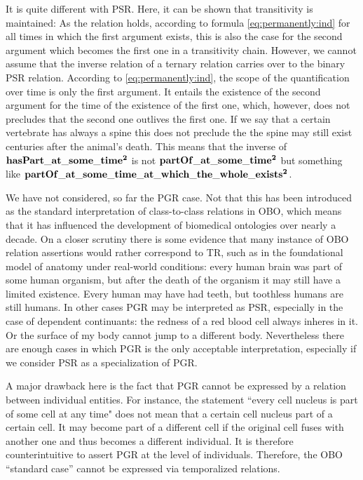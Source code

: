 It is quite different with PSR. Here, it can be shown that transitivity is maintained: As the relation holds, according to formula \ref{eq:permanently:ind} for all times in which the first argument exists, this is also the case for the second argument which becomes the first one in a transitivity chain.
However, we cannot assume that the inverse relation of a ternary relation carries over to the binary PSR relation. According to \ref{eq:permanently:ind}, the scope of the quantification over time is only the first argument. It entails the existence of the second argument for the time of the existence of the first one, which, however, does not precludes that the second one outlives the first one. If we say that a certain vertebrate has always a spine this does not preclude the the spine may still exist centuries after the animal's death.    
This means that the inverse of $\mathrm{\mathbf{hasPart\_at\_some\_time^2}}$ is not $\mathrm{\mathbf{partOf\_at\_some\_time^2}}$ but something like $\mathrm{\mathbf{partOf\_at\_some\_time\_at\_which\_the\_whole\_exists^2}}$.  



We have not considered, so far the PGR case. Not that this has been introduced as the standard interpretation of class-to-class relations in OBO, which means that it has influenced the development of biomedical ontologies over nearly a decade. On a closer scrutiny there is some evidence that many instance of OBO relation assertions would rather correspond to TR, such as in the foundational model of anatomy under real-world conditions: every human brain was part of some human organism, but after the death of the organism it may still have a limited existence. Every human may have had teeth, but toothless humans are still humans. In other cases PGR may be interpreted as PSR, especially in the case of dependent continuants: the redness of a red blood cell always inheres in it. Or the surface of my body cannot jump to a different body. Nevertheless there are enough cases in which PGR is the only acceptable interpretation, especially if we consider PSR as a specialization of PGR.

A major drawback here is the fact that PGR cannot be expressed by a relation between individual entities. For instance, the statement ``every cell nucleus is part of some cell at any time" does not mean that a certain cell nucleus part of a certain cell. It may become part of a different cell if the original cell fuses with another one and thus becomes a different individual. It is therefore counterintuitive to assert PGR at the level of individuals. Therefore, the OBO ``standard case'' cannot be expressed via temporalized relations.

